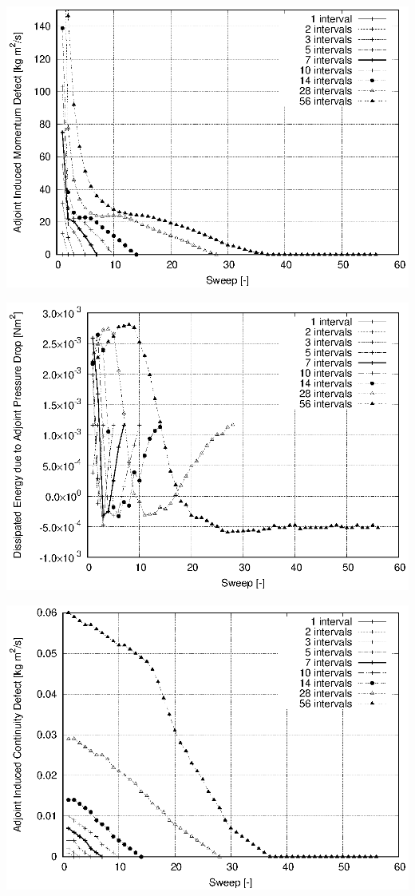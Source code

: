 \documentclass[twoside,a4paper,12pt,bibliography=totoc, parskip=half,english]{scrreprt}
\begin{document}
\includegraphics[scale=1]{13_adjoint_modef_newton.eps}

\includegraphics[scale=1]{12_adjoint_modef_newton.eps}

\includegraphics[scale=1]{14_adjoint_modef_newton.eps}
\end{document}
